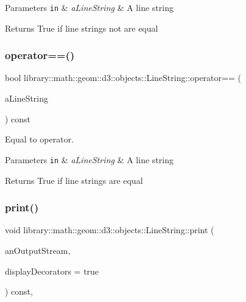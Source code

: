 \begin{DoxyParams}[1]{Parameters}
\mbox{\tt in}  & {\em a\+Line\+String} & A line string \\
\hline
\end{DoxyParams}
\begin{DoxyReturn}{Returns}
True if line strings not are equal 
\end{DoxyReturn}
\mbox{\label{classlibrary_1_1math_1_1geom_1_1d3_1_1objects_1_1_line_string_ab413b3ed8f6f78697420f6c4c3b4d0e6}} 
\subsubsection{\texorpdfstring{operator==()}{operator==()}}
{\footnotesize\ttfamily bool library\+::math\+::geom\+::d3\+::objects\+::\+Line\+String\+::operator== (\begin{DoxyParamCaption}\item[{const \hyperlink{classlibrary_1_1math_1_1geom_1_1d3_1_1objects_1_1_line_string}{Line\+String} \&}]{a\+Line\+String }\end{DoxyParamCaption}) const}



Equal to operator. 


\begin{DoxyParams}[1]{Parameters}
\mbox{\tt in}  & {\em a\+Line\+String} & A line string \\
\hline
\end{DoxyParams}
\begin{DoxyReturn}{Returns}
True if line strings are equal 
\end{DoxyReturn}
\mbox{\label{classlibrary_1_1math_1_1geom_1_1d3_1_1objects_1_1_line_string_a289414dbfc4ff32520f546c8a435170f}} 
\subsubsection{\texorpdfstring{print()}{print()}}
{\footnotesize\ttfamily void library\+::math\+::geom\+::d3\+::objects\+::\+Line\+String\+::print (\begin{DoxyParamCaption}\item[{std\+::ostream \&}]{an\+Output\+Stream,  }\item[{bool}]{display\+Decorators = {\ttfamily true} }\end{DoxyParamCaption}) const\hspace{0.3cm}{\ttfamily [override]}, {\ttfamily [virtual]}}



